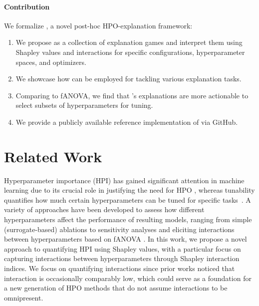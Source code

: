 \documentclass[letterpaper]{article} %
\begin{document}
\paragraph{Contribution}

We formalize \tool, a novel post-hoc HPO-explanation framework:%
\begin{enumerate}[itemsep=0em,topsep=-0.25em] 
    \item[\textbf{(1)}] We propose \tool as a collection of \numgames explanation games and interpret them using Shapley values and interactions for specific configurations, 
    hyperparameter spaces, 
    and optimizers.
    \item[\textbf{(2)}] We showcase how \tool can be employed for tackling various explanation tasks.
    \item[\textbf{(3)}] Comparing to fANOVA, we find that \tool's explanations are more actionable to select subsets of hyperparameters for tuning.
    \item[\textbf{(4)}] We provide a publicly available reference implementation of \tool via GitHub.
\end{enumerate}

\section{Related Work}\label{sec:related-work}

Hyperparameter importance (HPI) has gained significant attention in machine learning due to its crucial role in justifying the need for HPO \citep{DBLP:conf/gecco/PushakH20a,DBLP:journals/telo/PushakH22,DBLP:conf/ppsn/SchneiderSPBTK22}, whereas tunability quantifies how much certain hyperparameters can be tuned for specific tasks~\citep{tunability}.
A variety of approaches have been developed to assess how different hyperparameters affect the performance of resulting models, ranging from simple (surrogate-based) ablations \citep{Fawcett-jh16a,DBLP:conf/aaai/BiedenkappLEHFH17} to sensitivity analyses and eliciting interactions between hyperparameters based on fANOVA \citep{fANOVA,DBLP:conf/kdd/RijnH18,elShawiTuneOrNotTune,DBLP:conf/ijcai/WatanabeBH23}. 
In this work, we propose a novel approach to quantifying HPI using Shapley values, with a particular focus on capturing interactions between hyperparameters through Shapley interaction indices. We focus on quantifying interactions since prior works \citep{zimmer-tpami21a,DBLP:journals/telo/PushakH22,DBLP:journals/jscic/NovelloPLC23} noticed that interaction is occasionally comparably low, which could serve as a foundation for a new generation of HPO methods that do not assume interactions to be omnipresent.
\end{document}
